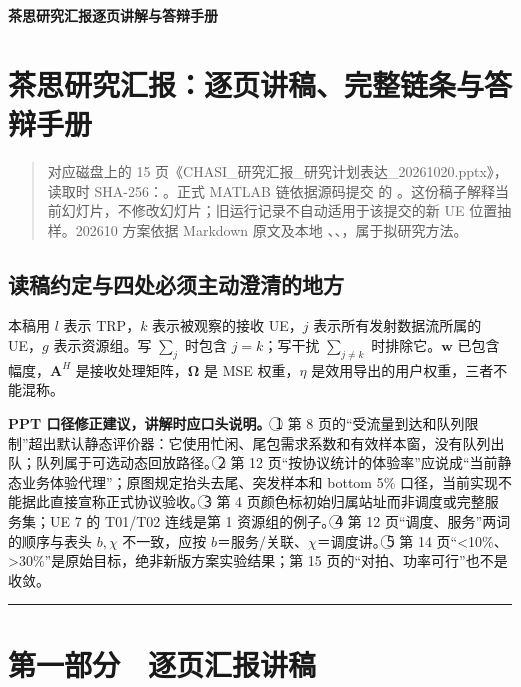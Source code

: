 \documentclass[11pt,a4paper]{ctexart}
\begin{document}
\begin{center}\LARGE\bfseries 茶思研究汇报逐页讲解与答辩手册\end{center}
\tableofcontents\clearpage
\clearpage\section*{茶思研究汇报：逐页讲稿、完整链条与答辩手册}

\begin{quote}\small 对应磁盘上的 15 页《CHASI\_研究汇报\_研究计划表达\_20261020.pptx》，读取时 SHA-256：。正式 MATLAB 链依据源码提交  的 。这份稿子解释当前幻灯片，不修改幻灯片；旧运行记录不自动适用于该提交的新 UE 位置抽样。202610 方案依据 Markdown 原文及本地 、、，属于拟研究方法。\end{quote}

\subsection*{读稿约定与四处必须主动澄清的地方}

本稿用 $l$ 表示 TRP，$k$ 表示被观察的接收 UE，$j$ 表示所有发射数据流所属的 UE，$g$ 表示资源组。写 $\sum_j$ 时包含 $j=k$；写干扰 $\sum_{j\ne k}$ 时排除它。$\mathbf w$ 已包含幅度，$ \mathbf A^H$ 是接收处理矩阵，$\boldsymbol\Omega$ 是 MSE 权重，$\eta$ 是效用导出的用户权重，三者不能混称。\par

\textbf{PPT 口径修正建议，讲解时应口头说明。} \textcircled{1} 第 8 页的“受流量到达和队列限制”超出默认静态评价器：它使用忙闲、尾包需求系数和有效样本窗，没有队列出队；队列属于可选动态回放路径。\textcircled{2} 第 12 页“按协议统计的体验率”应说成“当前静态业务体验代理”；原图规定抬头去尾、突发样本和 bottom 5\% 口径，当前实现不能据此直接宣称正式协议验收。\textcircled{3} 第 4 页颜色标初始归属站址而非调度或完整服务集；UE 7 的 T01/T02 连线是第 1 资源组的例子。\textcircled{4} 第 12 页“调度、服务”两词的顺序与表头 $b,\chi$ 不一致，应按 $b$＝服务/关联、$\chi$＝调度讲。\textcircled{5} 第 14 页“<10\%、>30\%”是原始目标，绝非新版方案实验结果；第 15 页的“对拍、功率可行”也不是收敛。\par

\par\medskip\hrule\medskip

\clearpage\section*{第一部分　逐页汇报讲稿}
\end{document}

